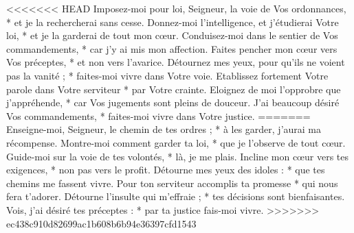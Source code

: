 <<<<<<< HEAD
Imposez-moi pour loi, Seigneur, la voie de Vos ordonnances, * et je la rechercherai sans cesse.
\versseparator
Donnez-moi l'intelligence, et j'étudierai Votre loi, * et je la garderai de tout mon cœur.
\versseparator
Conduisez-moi dans le sentier de Vos commandements, * car j'y ai mis mon affection.
\versseparator
Faites pencher mon cœur vers Vos préceptes, * et non vers l'avarice.
\versseparator
Détournez mes yeux, pour qu'ils ne voient pas la vanité ; * faites-moi vivre dans Votre voie.
\versseparator
Etablissez fortement Votre parole dans Votre serviteur * par Votre crainte.
\versseparator
Eloignez de moi l'opprobre que j'appréhende, * car Vos jugements sont pleins de douceur.
\versseparator
J'ai beaucoup désiré Vos commandements, * faites-moi vivre dans Votre justice.
=======
Enseigne-moi, Seigneur, le chemin de tes ordres ; *
à les garder, j’aurai ma récompense.
\versseparator
Montre-moi comment garder ta loi, *
que je l’observe de tout cœur.
\versseparator
Guide-moi sur la voie de tes volontés, *
là, je me plais.
\versseparator
Incline mon cœur vers tes exigences, *
non pas vers le profit.
\versseparator
Détourne mes yeux des idoles : *
que tes chemins me fassent vivre.
\versseparator
Pour ton serviteur accomplis ta promesse *
qui nous fera t’adorer.
\versseparator
Détourne l’insulte qui m’effraie ; *
tes décisions sont bienfaisantes.
\versseparator
Vois, j’ai désiré tes préceptes : *
par ta justice fais-moi vivre.
>>>>>>> ec438c910d82699ac1b608b6b94e36397cfd1543
